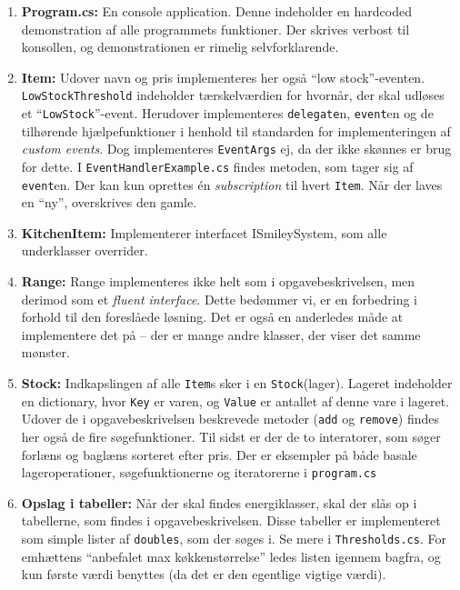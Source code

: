 \documentclass[11pt]{article}
\newcommand{\mono}{\texttt}
\begin{document}
\begin{enumerate}
	\item[] \textbf{Program.cs:} En console application. Denne indeholder en hardcoded demonstration af alle programmets funktioner. Der skrives verbost til konsollen, og demonstrationen er rimelig selvforklarende.
	
	\item[] \textbf{Item:} Udover navn og pris implementeres her også ``low stock''-eventen. \mono{LowStockThreshold} indeholder tærskelværdien for hvornår, der skal udløses et ``\mono{LowStock}''-event. Herudover implementeres \mono{delegate}n, \mono{event}en og de tilhørende hjælpefunktioner i henhold til standarden for implementeringen af \emph{custom events}. Dog implementeres \mono{EventArgs} ej, da der ikke skønnes er brug for dette. I \mono{EventHandlerExample.cs} findes metoden, som tager sig af \mono{event}en. Der kan kun oprettes én \emph{subscription} til hvert \mono{Item}. Når der laves en ``ny'', overskrives den gamle.
	
	\item[] \textbf{KitchenItem:} Implementerer interfacet ISmileySystem, som alle underklasser overrider.
	
	\item[] \textbf{Range:} Range implementeres ikke helt som i opgavebeskrivelsen, men derimod som et \emph{fluent interface}. Dette bedømmer vi, er en forbedring i forhold til den foreslåede løsning. Det er også en anderledes måde at implementere det på -- der er mange andre klasser, der viser det samme mønster.
	
	\item[] \textbf{Stock:} Indkapslingen af alle \mono{Item}s sker i en \mono{Stock}(lager). Lageret indeholder en dictionary, hvor \mono{Key} er varen, og \mono{Value} er antallet af denne vare i lageret. Udover de i opgavebeskrivelsen beskrevede metoder (\mono{add} og \mono{remove}) findes her også de fire søgefunktioner. Til sidst er der de to interatorer, som søger forlæns og baglæns sorteret efter pris. Der er eksempler på både basale lageroperationer, søgefunktionerne og iteratorerne i \mono{program.cs}
	
	\item[] \textbf{Opslag i tabeller:} Når der skal findes energiklasser, skal der slås op i tabellerne, som findes i opgavebeskrivelsen. Disse tabeller er implementeret som simple lister af \mono{doubles}, som der søges i. Se mere i \mono{Thresholds.cs}. For emhættens ``anbefalet max køkkenstørrelse'' ledes listen igennem bagfra, og kun første værdi benyttes (da det er den egentlige vigtige værdi).
\end{enumerate}
\end{document}
